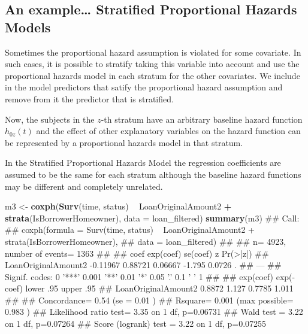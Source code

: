 \documentclass[]{book}
\makeatletter
\newenvironment{Shaded}{\begin{snugshade}}{\end{snugshade}}
\newcommand{\KeywordTok}[1]{\textcolor[rgb]{0.13,0.29,0.53}{\textbf{#1}}}
\newcommand{\DataTypeTok}[1]{\textcolor[rgb]{0.13,0.29,0.53}{#1}}
\newcommand{\StringTok}[1]{\textcolor[rgb]{0.31,0.60,0.02}{#1}}
\newcommand{\OperatorTok}[1]{\textcolor[rgb]{0.81,0.36,0.00}{\textbf{#1}}}
\newcommand{\NormalTok}[1]{#1}
\newenvironment{kframe}{%
\medskip{}
\setlength{\fboxsep}{.8em}
 \def\at@end@of@kframe{}%
 \ifinner\ifhmode%
  \def\at@end@of@kframe{\end{minipage}}%
  \begin{minipage}{\columnwidth}%
 \fi\fi%
 \def\FrameCommand##1{\hskip\@totalleftmargin \hskip-\fboxsep
 \colorbox{shadecolor}{##1}\hskip-\fboxsep
     \hskip-\linewidth \hskip-\@totalleftmargin \hskip\columnwidth}%
 \MakeFramed {\advance\hsize-\width
   \@totalleftmargin\z@ \linewidth\hsize
   \@setminipage}}%
 {\par\unskip\endMakeFramed%
 \at@end@of@kframe}
\renewenvironment{Shaded}{\begin{kframe}}{\end{kframe}}
\theoremstyle{definition}
\theoremstyle{definition}
\theoremstyle{definition}
\theoremstyle{remark}
\makeatother
\begin{document}
\subsection{An example\ldots{} Stratified Proportional Hazards
Models}\label{an-example-stratified-proportional-hazards-models}

Sometimes the proportional hazard assumption is violated for some
covariate. In such cases, it is possible to stratify taking this
variable into account and use the proportional hazards model in each
stratum for the other covariates. We include in the model predictors
that satify the proportional hazard assumption and remove from it the
predictor that is stratified.

Now, the subjects in the \(z\)-th stratum have an arbitrary baseline
hazard function \(h_{0z}(t)\) and the effect of other explanatory
variables on the hazard function can be represented by a proportional
hazards model in that stratum.

In the Stratified Proportional Hazards Model the regression coefficients
are assumed to be the same for each stratum although the baseline hazard
functions may be different and completely unrelated.

\begin{Shaded}
\begin{Highlighting}[]
\NormalTok{m3 <-}\StringTok{ }\KeywordTok{coxph}\NormalTok{(}\KeywordTok{Surv}\NormalTok{(time, status) }\OperatorTok{~}\StringTok{ }\NormalTok{LoanOriginalAmount2  }\OperatorTok{+}
\StringTok{              }\KeywordTok{strata}\NormalTok{(IsBorrowerHomeowner), }\DataTypeTok{data =}\NormalTok{ loan_filtered) }
\KeywordTok{summary}\NormalTok{(m3)}
\NormalTok{## Call:}
\NormalTok{## coxph(formula = Surv(time, status) ~ LoanOriginalAmount2 + strata(IsBorrowerHomeowner), }
\NormalTok{##     data = loan_filtered)}
\NormalTok{## }
\NormalTok{##   n= 4923, number of events= 1363 }
\NormalTok{## }
\NormalTok{##                         coef exp(coef) se(coef)      z Pr(>|z|)  }
\NormalTok{## LoanOriginalAmount2 -0.11967   0.88721  0.06667 -1.795   0.0726 .}
\NormalTok{## ---}
\NormalTok{## Signif. codes:  0 '***' 0.001 '**' 0.01 '*' 0.05 '.' 0.1 ' ' 1}
\NormalTok{## }
\NormalTok{##                     exp(coef) exp(-coef) lower .95 upper .95}
\NormalTok{## LoanOriginalAmount2    0.8872      1.127    0.7785     1.011}
\NormalTok{## }
\NormalTok{## Concordance= 0.54  (se = 0.01 )}
\NormalTok{## Rsquare= 0.001   (max possible= 0.983 )}
\NormalTok{## Likelihood ratio test= 3.35  on 1 df,   p=0.06731}
\NormalTok{## Wald test            = 3.22  on 1 df,   p=0.07264}
\NormalTok{## Score (logrank) test = 3.22  on 1 df,   p=0.07255}
\end{Highlighting}
\end{Shaded}
\end{document}
